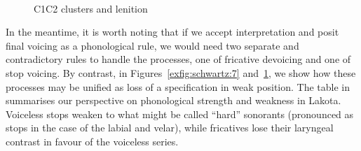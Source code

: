 \documentclass[output=paper]{langscibook}
\begin{document}
\begin{figure}
\caption{\label{exfig:schwartz:8}C1C2 clusters and lenition}
\hfill
{}
\hfill
{}
\hfill~
\end{figure}

In the meantime, it is worth noting that if we accept  interpretation and posit final voicing as a phonological rule, we would need two separate and contradictory rules to handle the processes, one of fricative devoicing and one of stop voicing. By contrast, in Figures~\ref{exfig:schwartz:7} and~\ref{exfig:schwartz:8}, we show how these processes may be unified as loss of a specification in weak position. The table in  summarises our perspective on phonological strength and weakness in Lakota. Voiceless stops weaken to what might be called “hard” sonorants (pronounced as stops in the case of the labial and velar), while fricatives lose their laryngeal contrast in favour of the voiceless series.


\begin{table}
\caption{\label{extab:schwartz:9}Lakota consonantal lenition – strong and weak positions}
\end{table}
\end{document}
